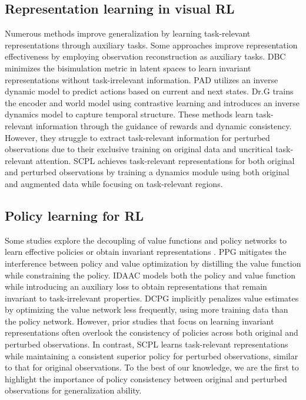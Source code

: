 \subsection{Representation learning in visual RL} 
Numerous methods \cite{iso-dream, ted} improve generalization by learning task-relevant representations through auxiliary tasks. 
Some approaches \cite{does?} improve representation effectiveness by employing observation reconstruction as auxiliary tasks. 
DBC \cite{dbc} minimizes the bisimulation metric in latent spaces to learn invariant representations without task-irrelevant information. 
PAD \cite{pad} utilizes an inverse dynamic model to predict actions based on current and next states.
Dr.G \cite{drg} trains the encoder and world model using contrastive learning and introduces an inverse dynamics model to capture temporal structure.
These methods learn task-relevant information through the guidance of rewards and dynamic consistency.
However, they struggle to extract task-relevant information for perturbed observations due to their exclusive training on original data and uncritical task-relevant attention.
SCPL achieves task-relevant representations for both original and perturbed observations by training a dynamics module using both original and augmented data while focusing on task-relevant regions.

\vspace{-.2cm}
\subsection{Policy learning for RL} 
Some studies explore the decoupling of value functions and policy networks to learn effective policies or obtain invariant representations \cite{yarats2021improving, andrychowicz2020matters}.
PPG \cite{ppg} mitigates the interference between policy and value optimization by distilling the value function while constraining the policy.
IDAAC \cite{idaac} models both the policy and value function while introducing an auxiliary loss to obtain representations that remain invariant to task-irrelevant properties.
DCPG \cite{dcpg} implicitly penalizes value estimates by optimizing the value network less frequently, using more training data than the policy network.
However, prior studies that focus on learning invariant representations often overlook the consistency of policies across both original and perturbed observations.
In contrast, SCPL learns task-relevant representations while maintaining a consistent superior policy for perturbed observations, similar to that for original observations.
To the best of our knowledge, we are the first to highlight the importance of policy consistency between original and perturbed observations for generalization ability.


\vspace{-.2cm}